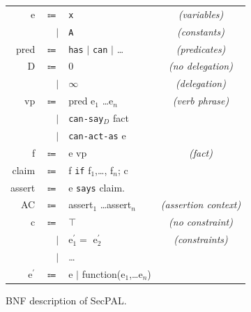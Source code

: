 \documentclass[thesis.tex]{subfiles}
\begin{document}
\newcommand{\bnfcomment}[1]{\slshape{\color{gray} (#1)}}
\newcommand{\secpal}[1]{\texttt{#1}}
\begin{figure}\footnotesize
  \begin{tabular}{r r l c}
    e          & $\Coloneqq$ & \secpal{x}                                       & \bnfcomment{variables}         \\
               & $\vert$     & \secpal{A}                                       & \bnfcomment{constants}         \\
    pred       & $\Coloneqq$ & \secpal{has} $\vert$ \secpal{can} $\vert$ \dots  & \bnfcomment{predicates}        \\
    D          & $\Coloneqq$ & 0                                                & \bnfcomment{no delegation}     \\
               & $\vert$     & $\infty$                                         & \bnfcomment{delegation}        \\
    vp         & $\Coloneqq$ & pred e$_1$ \dots e$_n$                           & \bnfcomment{verb phrase}       \\
               & $\vert$     & \secpal{can-say}$_D$ fact                       \\
               & $\vert$     & \secpal{can-act-as}  e                          \\
    f          & $\Coloneqq$ & e vp                                             & \bnfcomment{fact}              \\
    claim      & $\Coloneqq$ & f \secpal{if} f$_1$,\dots, f$_n$; c             \\
    assert     & $\Coloneqq$ & e \secpal{says} claim.                          \\
    AC         & $\Coloneqq$ & assert$_1$ \dots assert$_n$                      & \bnfcomment{assertion context} \\
    c          & $\Coloneqq$ & $\top$                                           & \bnfcomment{no constraint}     \\
               & $\vert$     & e$^\prime_1 =$ e$^\prime_2$                      & \bnfcomment{constraints}       \\
               & $\vert$     & \dots                                           \\
    e$^\prime$ & $\Coloneqq$ & e $\vert$ function(e$_1$,\dots e$_n$)           \\
  \end{tabular}
  \caption{BNF description of SecPAL.}
\label{fig:secpal-grammar}
\end{figure}
\end{document}
